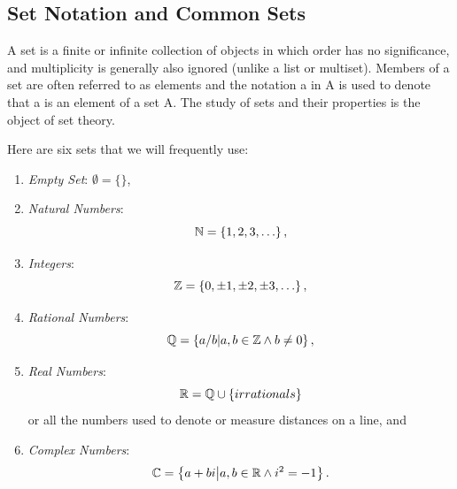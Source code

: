 \subsection{Set Notation and Common Sets}

\begin{defn}[Set]
    A set is a finite or infinite collection of objects in which order has no significance, and multiplicity is generally also ignored (unlike a list or multiset). Members of a set are often referred to as elements and the notation a in A is used to denote that a is an element of a set A. The study of sets and their properties is the object of set theory.\cite{mathworldset}
\end{defn}

\begin{note}
    Here are six sets that we will frequently use:
    \begin{enumerate}
        \item \emph{Empty Set}: \(\emptyset=\{\}\),
        \item \emph{Natural Numbers}: \[\mbox{$\mathbb{N}$}=\left\{1,2,3,\ldots\right\},\]
        \item \emph{Integers}: \[\mbox{$\mathbb{Z}$}=\left\{0,\pm1,\pm2,\pm3,\ldots\right\},\]
        \item \emph{Rational Numbers}: \[\mbox{$\mathbb{Q}$}=\left\{a/b\middle|a,b\in\mbox{$\mathbb{Z}$} \wedge b\neq0\right\},\]
        \item \emph{Real Numbers}: \[\mbox{$\mathbb{R}$}=\mbox{$\mathbb{Q}$}\cup \left\{irrationals\right\}\] or all the numbers used to denote or measure distances on a line, and
        \item \emph{Complex Numbers}: \[\mbox{$\mathbb{C}$}=\left\{a+bi\middle|a,b\in\mbox{$\mathbb{R}$} \wedge i^2=-1\right\}.\]
    \end{enumerate}
\end{note}


